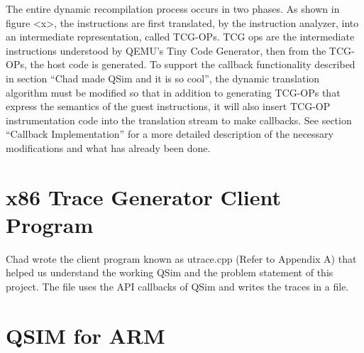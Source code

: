 \documentclass[letterpaper,11pt,twocolumn]{article}
\begin{document}
The entire dynamic recompilation process occurs in two phases. As shown in figure <x>, the instructions are first translated, by the instruction analyzer, into an intermediate representation, called TCG-OPs. TCG ops are the intermediate instructions understood by QEMU's Tiny Code Generator, then from the TCG-OPs, the host code is generated.
To support the callback functionality described in section “Chad made QSim and it is so cool”, the dynamic translation algorithm must be modified so that in addition to generating TCG-OPs that express the semantics of the guest instructions, it will also insert TCG-OP instrumentation code into the translation stream to make callbacks. See section “Callback Implementation” for a more detailed description of the necessary modifications and what has already been done.
\section{x86 Trace Generator Client Program}
Chad wrote the client program known as utrace.cpp (Refer to Appendix A) that helped us understand the working QSim and the problem statement of this project. The file uses the API callbacks of QSim and writes the traces in a file.
\section{QSIM for ARM}
\end{document}
